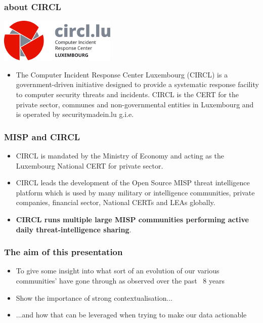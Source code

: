 
\begin{frame}
\titlepage
\end{frame}

\begin{frame}
  \frametitle{about CIRCL}
  \includegraphics[scale=0.4]{circl.png}
  \begin{itemize}
    \item The Computer Incident Response Center Luxembourg (CIRCL) is a government-driven initiative designed to provide a systematic response facility to computer security threats and incidents. CIRCL is the CERT for the private sector, communes and non-governmental entities in Luxembourg and is operated by securitymadein.lu g.i.e.
  \end{itemize}
\end{frame}

\begin{frame}
  \frametitle{MISP and CIRCL}
  \begin{itemize}
    \item CIRCL is mandated by the Ministry of Economy and acting as the Luxembourg National CERT for private sector.
    \item CIRCL leads the development of the Open Source MISP threat intelligence platform which is used by many military or intelligence communities, private companies, financial sector, National CERTs and LEAs globally.
    \item {\bf CIRCL runs multiple large MISP communities performing active daily threat-intelligence sharing}.
  \end{itemize}
\end{frame}

\begin{frame}
  \frametitle{The aim of this presentation}
  \begin{itemize}
     \item To give some insight into what sort of an evolution of our various communities' have gone through as observed over the past ~8 years
     \item Show the importance of strong contextualisation...
     \item ...and how that can be leveraged when trying to make our data actionable
  \end{itemize}
\end{frame}

